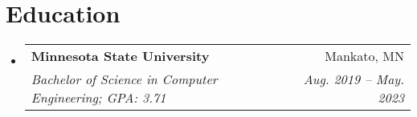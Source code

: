\documentclass[letterpaper,11pt]{article}
\makeatletter
\newcommand{\resumeSubheading}[4]{
  \vspace{-1pt}\item
    \begin{tabular*}{0.97\textwidth}{l@{\extracolsep{\fill}}r}
      \textbf{#1} & #2 \\
      \textit{\small#3} & \textit{\small #4} \\
    \end{tabular*}\vspace{-5pt}
}
\newcommand{\resumeSubHeadingListStart}{\begin{itemize}[leftmargin=*]}
\newcommand{\resumeSubHeadingListEnd}{\end{itemize}}
\makeatother
\begin{document}
\section{Education}
  \resumeSubHeadingListStart
    \resumeSubheading
      {Minnesota State University}{Mankato, MN}
      {Bachelor of Science in Computer Engineering;  GPA: 3.71}{Aug. 2019 -- May. 2023}
  \resumeSubHeadingListEnd

\end{document}
